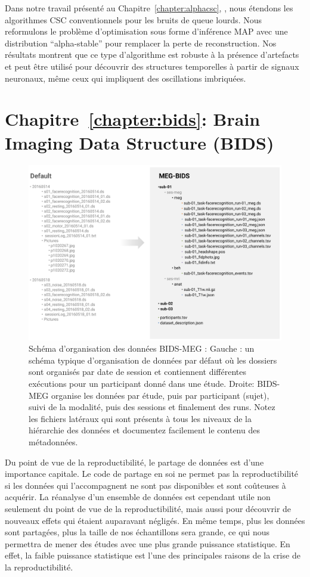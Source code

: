 Dans notre travail présenté au Chapitre~\ref{chapter:alphacsc}, , nous étendons les algorithmes CSC conventionnels pour les bruits de queue lourds. Nous reformulons le problème d'optimisation sous forme d'inférence MAP avec une distribution “alpha-stable” pour remplacer la perte de reconstruction. Nos résultats montrent que ce type d'algorithme est robuste à la présence d'artefacts et peut être utilisé pour découvrir des structures temporelles à partir de signaux neuronaux, même ceux qui impliquent des oscillations imbriquées.

\section*{Chapitre~\ref{chapter:bids}: Brain Imaging Data Structure (BIDS)}

\begin{figure}[htb!]
\begin{center}
   \includegraphics[width=\linewidth]{figures/bids_organization.png}
\end{center}
   \caption[]{Schéma d'organisation des données BIDS-MEG : Gauche : un schéma typique d'organisation de données par défaut où les dossiers sont organisés par date de session et contiennent différentes exécutions pour un participant donné dans une étude. Droite: BIDS-MEG organise les données par étude, puis par participant (sujet), suivi de la modalité, puis des sessions et finalement des runs. Notez les fichiers latéraux qui sont présents à tous les niveaux de la hiérarchie des données et documentez facilement le contenu des métadonnées.}
   \label{fig:sommaire:BIDS-MEG-organization}
\end{figure}
Du point de vue de la reproductibilité, le partage de données est d'une importance capitale. Le code de partage en soi ne permet pas la reproductibilité si les données qui l'accompagnent ne sont pas disponibles et sont coûteuses à acquérir. La réanalyse d'un ensemble de données est cependant utile non seulement du point de vue de la reproductibilité, mais aussi pour découvrir de nouveaux effets qui étaient auparavant négligés. En même temps, plus les données sont partagées, plus la taille de nos échantillons sera grande, ce qui nous permettra de mener des études avec une plus grande puissance statistique. En effet, la faible puissance statistique est l'une des principales raisons de la crise de la reproductibilité.

